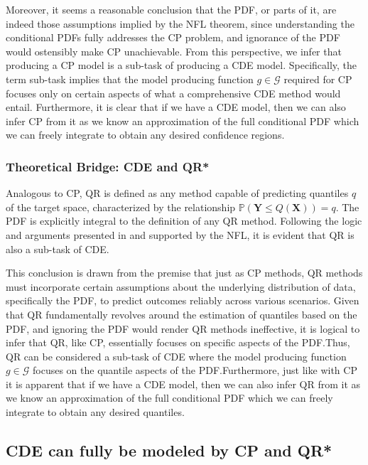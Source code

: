Moreover, it seems a reasonable conclusion that the PDF, or parts of it, are indeed those assumptions implied by the NFL theorem, since understanding the conditional PDFs fully addresses the CP problem, and ignorance of the PDF would ostensibly make CP unachievable. From this perspective, we infer that producing a CP model is a sub-task of producing a CDE model. Specifically, the term sub-task implies that the model producing function $g \in \mathcal{G}$ required for CP focuses only on certain aspects of what a comprehensive CDE method would entail. Furthermore, it is clear that if we have a CDE model, then we can also infer CP from it as we know an approximation of the full conditional PDF which we can freely integrate to obtain any desired confidence regions.

\subsubsection{Theoretical Bridge: CDE and QR*}\label{sec:bridge_cde_qr}

Analogous to CP, QR is defined as any method capable of predicting quantiles \( q \) of the target space, characterized by the relationship \( \mathbb{P}(\mathbf{Y} \leq Q(\mathbf{X})) = q \). The PDF is explicitly integral to the definition of any QR method. Following the logic and arguments presented in  and supported by the NFL, it is evident that QR is also a sub-task of CDE.\@

This conclusion is drawn from the premise that just as CP methods, QR methods must incorporate certain assumptions about the underlying distribution of data, specifically the PDF, to predict outcomes reliably across various scenarios. Given that QR fundamentally revolves around the estimation of quantiles based on the PDF, and ignoring the PDF would render QR methods ineffective, it is logical to infer that QR, like CP, essentially focuses on specific aspects of the PDF.\@ Thus, QR can be considered a sub-task of CDE where the model producing function \( g \in \mathcal{G} \) focuses on the quantile aspects of the PDF.\@ Furthermore, just like with CP it is apparent that if we have a CDE model, then we can also infer QR from it as we know an approximation of the full conditional PDF which we can freely integrate to obtain any desired quantiles.

\subsection{CDE can fully be modeled by CP and QR*}\label{sec:cde_sub_cp_qr}

